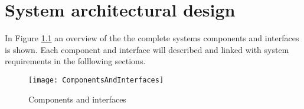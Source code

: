 \documentclass[Main]{subfiles}
\begin{document}
\chapter{System architectural design}
In Figure \ref{fig:ComponentsAndInterfaces} an overview of the the complete systems components and interfaces is shown. Each component and interface will described and linked with system requirements in the folllowing sections.

\begin{figure}[H]
\centering
\texttt{[image: ComponentsAndInterfaces]}
\caption{Components and interfaces}
\label{fig:ComponentsAndInterfaces}
\end{figure}


\newpage

\newpage

\end{document}
